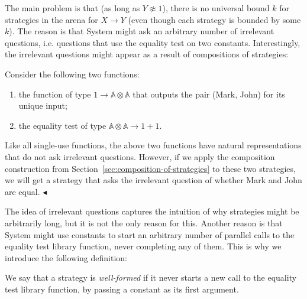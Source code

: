 \documentclass[10pt,a4paper]{amsart}
\numberwithin{equation}{section}
\theoremstyle{plain}
\newcommand{\atoms}{\mathbb A}
\newcommand{\exampleend}{$\blacktriangleleft$}
\begin{document}
The main problem is that (as long as $Y \not \approx 1$), there is no universal bound $k$ for strategies in the arena for $X \to Y$
(even though each strategy is bounded by some $k$). The  reason is that System might ask an arbitrary number of irrelevant questions, 
i.e. questions that use the equality test on two constants. Interestingly, the irrelevant questions might appear as a result of compositions of strategies:
\begin{example}\label{ex:irrelevant-questions-from-composition}
    Consider the  following two functions: 
    \begin{enumerate}
        \item the function of type  $1 \to \atoms \otimes \atoms$ that outputs the pair (Mark, John) for its unique input;
        \item the equality test of type $\atoms \otimes \atoms \to 1 + 1$.
    \end{enumerate}
    Like all single-use functions, the above two functions have natural representations that do not ask irrelevant questions.
    However, if we apply the composition construction from Section~\ref{sec:composition-of-strategies} to these two strategies, we will get a strategy that asks the irrelevant question of whether Mark and John are equal. \exampleend
\end{example}

The idea of irrelevant questions captures the intuition of why strategies might be arbitrarily long, but it is not the only reason for this. Another reason is that System might use constants to start an arbitrary number of parallel calls to the equality test library function, 
never completing any of them. This is why we introduce the following definition:
\begin{definition}
    We say that a strategy is \emph{well-formed} if it never starts a new call to the equality test library function, by passing a constant as its first argument.
\end{definition}
\end{document}
